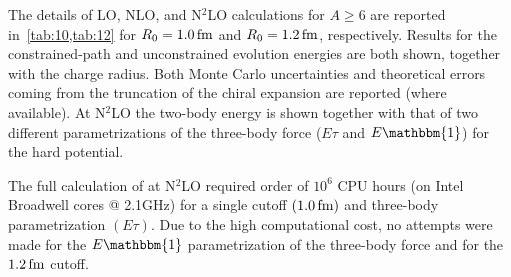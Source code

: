 \documentclass[aps,prc,twocolumn,superscriptaddress,floatfix]{revtex4-1}
\begin{document}
The details of LO, NLO, and N$^2$LO calculations for $A\ge6$ are reported in~\cref{tab:10,tab:12}
for $R_0=1.0\,\rm fm$ and $R_0=1.2\,\rm fm$, respectively. Results for the constrained-path and 
unconstrained evolution energies are both shown, together with the charge radius.
Both Monte Carlo uncertainties and theoretical errors coming from the truncation of the chiral 
expansion are reported (where available). At N$^2$LO the two-body energy is shown together with
that of two different parametrizations of the three-body force ($E\tau$ and $E\mathbbm{1}$)
for the hard potential.

The full calculation of  at N$^2$LO required 
order of $10^6$ CPU hours (on Intel Broadwell cores @ 2.1GHz) for a single cutoff $(1.0\,\rm fm)$ 
and three-body parametrization $(E\tau)$. Due to the high computational cost, no attempts were
made for the $E\mathbbm{1}$ parametrization of the three-body force and for the $1.2\,\rm fm$ cutoff.
\end{document}
